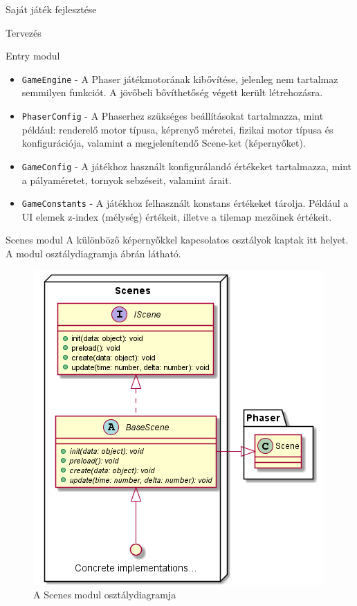 \begin{MyChapter}{Saját játék fejlesztése}
\begin{MySection}{Tervezés}
\begin{MySubSection}{Entry modul}
\begin{itemize}
				\item \texttt{GameEngine} - A Phaser játékmotorának kibővítése, jelenleg nem tartalmaz semmilyen funkciót. A jövőbeli bővíthetőség végett került létrehozásra.
				
				\item \texttt{PhaserConfig} - A Phaserhez szükséges beállításokat tartalmazza, mint például: renderelő motor típusa, képrenyő méretei, fizikai motor típusa és konfigurációja, valamint a megjelenítendő Scene-ket (képernyőket).
				
				\item \texttt{GameConfig} - A játékhoz használt konfigurálandó értékeket tartalmazza, mint a pályaméretet, tornyok sebzéseit, valamint árait.
				
				\item \texttt{GameConstants} - A játékhoz felhasznált konstans értékeket tárolja. Például a UI elemek z-index (mélység) értékeit, illetve a tilemap mezőinek értékeit.
			\end{itemize}
		\end{MySubSection}
	
		\begin{MySubSection}{Scenes modul}
			A különböző képernyőkkel kapcsolatos osztályok kaptak itt helyet.
			A modul osztálydiagramja  ábrán látható.
			
			\begin{figure}[h!]
				\centering
				\includegraphics[scale=0.8]{kepek/uml/scenes/scene-pt1.png}
				\caption{A Scenes modul osztálydiagramja}
				\label{fig:uml:scene}
			\end{figure}
			

\end{MySubSection}
\end{MySection}
\end{MyChapter}
